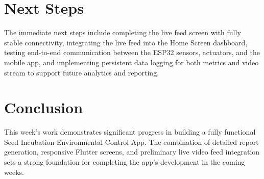 \documentclass[../weekly]{subfiles}
\begin{document}
\section{Next Steps}

The immediate next steps include completing the live feed screen with fully stable connectivity, integrating the live feed into the Home Screen dashboard, testing end-to-end communication between the ESP32 sensors, actuators, and the mobile app, and implementing persistent data logging for both metrics and video stream to support future analytics and reporting.

\section{Conclusion}

This week’s work demonstrates significant progress in building a fully functional Seed Incubation Environmental Control App. The combination of detailed report generation, responsive Flutter screens, and preliminary live video feed integration sets a strong foundation for completing the app’s development in the coming weeks.
\end{document}

